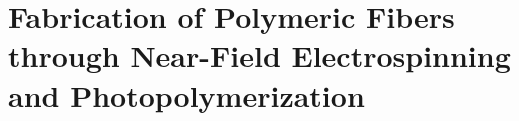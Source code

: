 
\chapter{Fabrication of Polymeric Fibers through Near-Field Electrospinning and Photopolymerization} %

\label{Chapter:5}

\section{}


